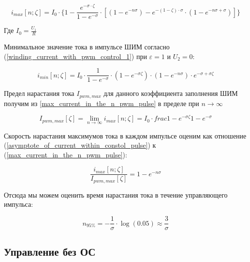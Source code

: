 \begin{equation}
    \label{max_current_in_the_n_pwm_pulse}
    i_{max}[n; \zeta] =
        I_{0} 
            \cdot \{ 1 
                     - \frac{ e^{-\sigma \cdot \zeta} }{ 1 - e^{-\sigma} }
                       \cdot [ (1 - e^{-n\sigma})
                               - e^{ -(1 - \zeta) \cdot \sigma }
                                    \cdot ( 1 - e^{-n\sigma + \sigma} )
                             ]
                  \}
\end{equation}

Где $I_0 = \frac{ U_{1} }{ R }$ 

Минимальное значение тока в импульсе ШИМ согласно (\ref{winding_current_with_pwm_control_1}) при
$\varepsilon=1$ и $U_{2}=0$:

\begin{equation}
    \label{min_current_in_the_n_pwm_pulse}
    i_{min}[n; \zeta] =
        I_{0} 
            \cdot \frac{ 1 }{ 1-e^{-\sigma} }
            \cdot (1 - e^{-\sigma\zeta})
            \cdot (1 - e^{-n\sigma})
            \cdot e^{-\sigma + \sigma\zeta} 
\end{equation}

Предел нарастания тока $I_{pwm,max}$ для данного коэффициента заполнения ШИМ получим из
\ref{max_current_in_the_n_pwm_pulse} в пределе при $n \to \infty$

\begin{equation}
    \label{asymptote_of_current_within_constol_pulse}
    I_{pwm,max}[\zeta]= 
        \lim_{n \to \infty} i_{max} [n; \zeta] = 
            I_{0} \cdot frac{ 1 - e^{-\sigma\zeta} }{ 1 - e^{-\sigma}}
\end{equation}

Скорость нарастания максимумов тока в каждом импульсе оценим как отношение 
(\ref{asymptote_of_current_within_constol_pulse}) к (\ref{max_current_in_the_n_pwm_pulse}):

\begin{equation}
    \label{ current_grow_estimate }
    \frac{ i_{max}[n; \zeta] }{ I_{pwm,max}[\zeta] } = 1 - e^{-n \sigma}
\end{equation}

Отсюда мы можем оценить время нарастания тока в течение управляющего импульса:

$$
    n_{ 95 \% } = - \frac{ 1 }{ \sigma }  \cdot \log{(0.05)} \approx \frac{ 3 }{ \sigma }
$$
\newpage
\subsection{ Управление без ОС }

